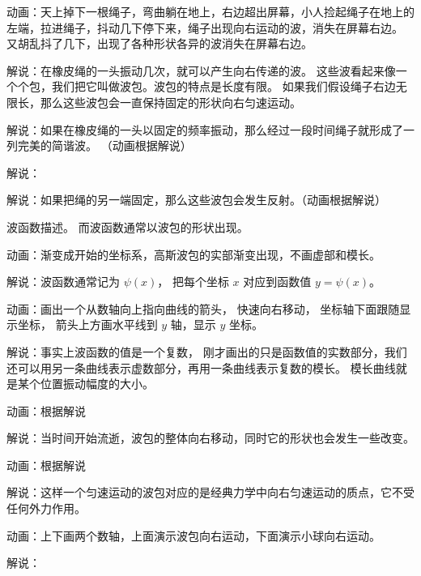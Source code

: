 动画：天上掉下一根绳子，弯曲躺在地上，右边超出屏幕，小人捡起绳子在地上的左端，拉进绳子，抖动几下停下来，绳子出现向右运动的波，消失在屏幕右边。 又胡乱抖了几下，出现了各种形状各异的波消失在屏幕右边。

解说：在橡皮绳的一头振动几次，就可以产生向右传递的波。 这些波看起来像一个个包，我们把它叫做波包。波包的特点是长度有限。 如果我们假设绳子右边无限长，那么这些波包会一直保持固定的形状向右匀速运动。

解说：如果在橡皮绳的一头以固定的频率振动，那么经过一段时间绳子就形成了一列完美的简谐波。
（动画根据解说）

解说：

解说：如果把绳的另一端固定，那么这些波包会发生反射。（动画根据解说）




波函数描述。 而波函数通常以波包的形状出现。

动画：渐变成开始的坐标系，高斯波包的实部渐变出现，不画虚部和模长。

解说：波函数通常记为 $\psi(x)$， 把每个坐标 $x$ 对应到函数值 $y = \psi(x)$。

动画：画出一个从数轴向上指向曲线的箭头， 快速向右移动， 坐标轴下面跟随显示坐标， 箭头上方画水平线到 $y$ 轴，显示 $y$ 坐标。

解说：事实上波函数的值是一个复数， 刚才画出的只是函数值的实数部分，我们还可以用另一条曲线表示虚数部分，再用一条曲线表示复数的模长。 模长曲线就是某个位置振动幅度的大小。

动画：根据解说

解说：当时间开始流逝，波包的整体向右移动，同时它的形状也会发生一些改变。

动画：根据解说

解说：这样一个匀速运动的波包对应的是经典力学中向右匀速运动的质点，它不受任何外力作用。

动画：上下画两个数轴，上面演示波包向右运动，下面演示小球向右运动。

解说：
